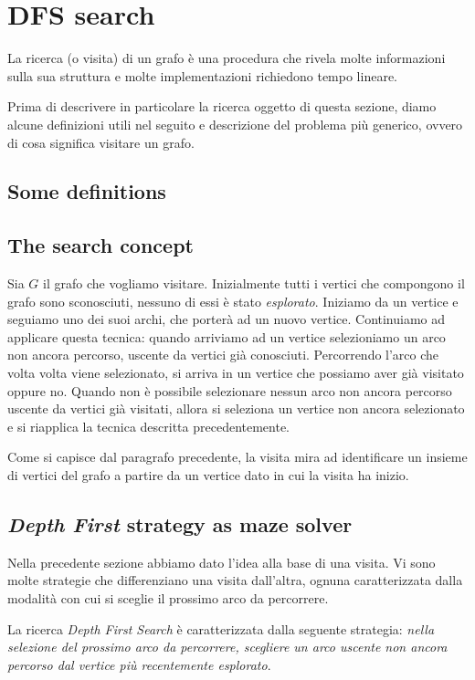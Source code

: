 \section{DFS search}

La ricerca (o visita) di un grafo \`e una procedura che rivela molte
informazioni sulla sua struttura e molte implementazioni richiedono
tempo lineare.

Prima di descrivere in particolare la ricerca oggetto di questa
sezione, diamo alcune definizioni utili nel seguito e descrizione del
problema pi\`u generico, ovvero di cosa significa visitare un grafo.

\subsection{Some definitions}
\label{subsection:some-definitions}

\subsection{The search concept}
Sia $G$ il grafo che vogliamo visitare. Inizialmente tutti i vertici
che compongono il grafo sono sconosciuti, nessuno di essi \`e stato
\emph{esplorato}. Iniziamo da un vertice e seguiamo uno dei suoi
archi, che porter\`a ad un nuovo vertice. Continuiamo ad applicare
questa tecnica: quando arriviamo ad un vertice selezioniamo un arco
non ancora percorso, uscente da vertici gi\`a conosciuti. Percorrendo
l'arco che volta volta viene selezionato, si arriva in un vertice che
possiamo aver gi\`a visitato oppure no. Quando non \`e possibile
selezionare nessun arco non ancora percorso uscente da vertici gi\`a
visitati, allora si seleziona un vertice non ancora selezionato e si
riapplica la tecnica descritta precedentemente.

Come si capisce dal paragrafo precedente, la visita mira ad
identificare un insieme di vertici del grafo a partire da un vertice
dato in cui la visita ha inizio.

\subsection{\emph{Depth First} strategy as maze solver}
Nella precedente sezione abbiamo dato l'idea alla base di una
visita. Vi sono molte strategie che differenziano una visita
dall'altra, ognuna caratterizzata dalla modalit\`a con cui si sceglie
il prossimo arco da percorrere.

La ricerca \emph{Depth First Search} \`e caratterizzata dalla seguente
strategia: \emph{nella selezione del prossimo arco da percorrere,
  scegliere un arco uscente non ancora percorso dal vertice pi\`u
  recentemente esplorato}.


